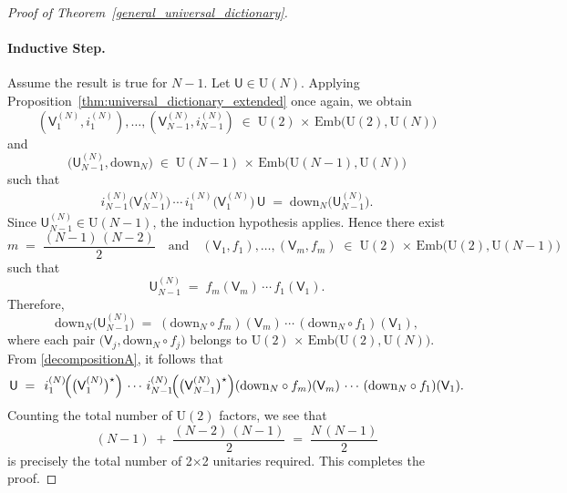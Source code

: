 \documentclass[a4paper,11pt]{article}
\newcommand{\rU}{\mathsf{U}}
\newcommand{\rV}{\mathsf{V}}
\begin{document}
\begin{appendices}
\begin{proof}[Proof of Theorem~\ref{general_universal_dictionary}]
\paragraph{Inductive Step.}
Assume the result is true for \(N - 1\). Let \(\rU \in \mathrm{U}(N)\). 
Applying Proposition~\ref{thm:universal_dictionary_extended} once again, 
we obtain 
\[
(\rV_1^{(N)}, i_1^{(N)}), \ldots, (\rV_{N-1}^{(N)}, i_{N-1}^{(N)}) 
\;\in\; 
\mathrm{U}(2)\,\times\, \mathrm{Emb}\!\bigl(\mathrm{U}(2), \mathrm{U}(N)\bigr)
\]
and 
\[
\bigl(\rU_{N-1}^{(N)}, \mathrm{down}_N\bigr) 
\;\in\; 
\mathrm{U}(N-1)\,\times\, \mathrm{Emb}\!\bigl(\mathrm{U}(N-1), \mathrm{U}(N)\bigr)
\]
such that
\begin{align}\label{decompositionA}
i_{N-1}^{(N)}\!\bigl(\rV_{N-1}^{(N)}\bigr)\,\cdots\,i_1^{(N)}\!\bigl(\rV_1^{(N)}\bigr)\,\rU 
\;=\; 
\mathrm{down}_N\!\bigl(\rU_{N-1}^{(N)}\bigr).
\end{align}
Since \(\rU_{N-1}^{(N)} \in \mathrm{U}(N-1)\), the induction hypothesis applies. 
Hence there exist 
\[
m \;=\; \frac{(N-1)\,(N-2)}{2}
\quad\text{and}\quad
(\rV_1,f_1), \ldots, (\rV_m,f_m) 
\;\in\;
\mathrm{U}(2)\,\times\, \mathrm{Emb}\!\bigl(\mathrm{U}(2), \mathrm{U}(N-1)\bigr)
\]
such that
\[
\rU_{N-1}^{(N)} 
\;=\; 
f_m(\rV_m)\,\cdots\,f_1(\rV_1).
\]
Therefore,
\[
\mathrm{down}_N\!\bigl(\rU_{N-1}^{(N)}\bigr)
\;=\;
(\mathrm{down}_N \circ f_m)(\rV_m)\,\cdots\,(\mathrm{down}_N \circ f_1)(\rV_1),
\]
where each pair 
\(\bigl(\rV_j,\mathrm{down}_N \circ f_j\bigr)\) 
belongs to 
\(\mathrm{U}(2)\,\times\, \mathrm{Emb}\!\bigl(\mathrm{U}(2), \mathrm{U}(N)\bigr)\). 
From \eqref{decompositionA}, it follows that
\[
\rU 
\;=\; \,
i_{1}^{(N)}\!\Bigl(\bigl(\rV_{1}^{(N)}\bigr)^{\star}\Bigr)\,\cdots\,i_{N-1}^{(N)}\!\Bigl(\bigl(\rV_{N-1}^{(N)}\bigr)^{\star}\Bigr)
(\mathrm{down}_N \circ f_m)(\rV_m)\,\cdots\,
(\mathrm{down}_N \circ f_1)(\rV_1).
\]
Counting the total number of \(\mathrm{U}(2)\) factors, we see that
\[
(N - 1) 
\;+\; 
\frac{(N - 2)\,(N - 1)}{2}
\;=\;
\frac{N\,(N - 1)}{2}
\]
is precisely the total number of 2\(\times\)2 unitaries required. 
This completes the proof.
\end{proof}

  
  \end{appendices}
  

%

\end{document}
